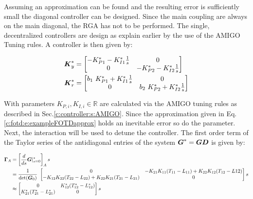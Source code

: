 Assuming an approximation can be found and the resulting error is sufficiently small the diagonal controller can be designed. Since the main coupling are always on the main diagonal, the RGA has not to be performed. The single, decentralized controllers are design as explain earlier by the use of the AMIGO Tuning rules. A controller is then given by:

\begin{align}
\begin{split}
\mbox{\boldmath$K$}_y^* &= \begin{bmatrix}
-K_{P1}^* - K_{I1}^*\frac{1}{s} & 0 \\
0 & -K_{P2}^* - K_{I2}^*\frac{1}{s}
\end{bmatrix} \\
\mbox{\boldmath$K$}_r^* &= \begin{bmatrix}
b_1~K_{P1}^* + K_{I1}^*\frac{1}{s} & 0 \\
0 & b_2~K_{P2}^* + K_{I2}^*\frac{1}{s}
\end{bmatrix} 
\end{split}
\label{c:fotd:e:exampleTransformedControler}
\end{align}

%  

With parameters $K_{P,i},K_{I,i} \in \mathbb{R}$ are calculated via the AMIGO tuning rules as described in Sec.\ref{c:controller:s:AMIGO}. Since the approximation given in Eq.\ref{c:fotd:e:exampleFOTDapprox} holds an inevitable error so do the parameter. \\

Next, the interaction will be used to detune the controller. The first order term of the Taylor series of the antidiagonal entries of the system $\mbox{\boldmath$G$}^* = \mbox{\boldmath$G$} \mbox{\boldmath$D$}$ is given by:

\begin{align}
\begin{split}
\mbox{\boldmath$\Gamma$}_A &= \left[\frac{d}{ds}\mbox{\boldmath$G$}|^*_{s=0}\right]_A s \\
&= \frac{1}{\det(\mbox{\boldmath$G$}_0)}~\begin{bmatrix}
0 & -K_{21}K_{11}(T_{11}-L_{11}) + K_{22}K_{12}(T_{12}-L{12}) \\
-K_{12}K_{22}(T_{22}-L_{22}) + K_{22}K_{21}(T_{21}-L_{21}) & 0
\end{bmatrix} s\\
&\approx \begin{bmatrix}
0 & K_{12}^* (T_{12}^* - L_{12}^*) \\
K_{21}^* (T_{21}^* - L_{21}^*) & 0 
\end{bmatrix} s
\end{split}
\label{c:fotd:e:exampleTransformedCoupling}
\end{align}

